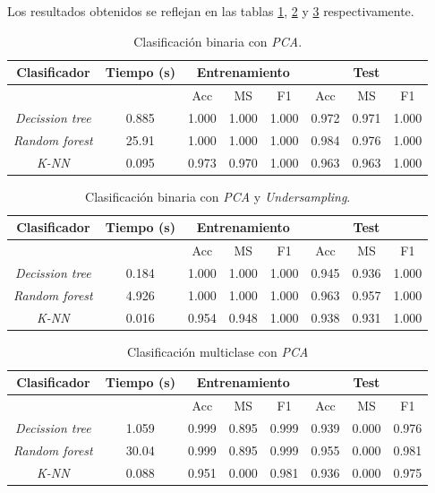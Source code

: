 Los resultados obtenidos se reflejan en las tablas \ref{tabla:binary_pca}, \ref{tabla:binary_under} y \ref{tabla:multi_pca} respectivamente.

\begin{table}[th]
	\centering
	\begin{tabular}{ |c|c|c|c|c|c|c|c| }
		\hline
		\rowcolor{LightCyan}
		Clasificador & Tiempo (s) & \multicolumn{3}{c|}{Entrenamiento} & \multicolumn{3}{c|}{Test} \\
		\hline
		\rowcolor{LightCyan}
		&            & Acc & MS & F1 & Acc & MS & F1 \\
		\hline
		\textit{Decission tree} & 0.885 & 1.000 & 1.000 & 1.000 & 0.972 & 0.971 & 1.000 \\
		\textit{Random forest}  & 25.91 & 1.000 & 1.000 & 1.000 & 0.984 & 0.976 & 1.000 \\
		\textit{K-NN}           & 0.095 & 0.973 & 0.970 & 1.000 & 0.963 & 0.963 & 1.000 \\
		\hline
	\end{tabular}
	\caption{Clasificación binaria con \textit{PCA}.}
	\label{tabla:binary_pca}
\end{table}

\begin{table}[th]
	\centering
	\begin{tabular}{ |c|c|c|c|c|c|c|c| }
		\hline
		\rowcolor{LightCyan}
		Clasificador & Tiempo (s) & \multicolumn{3}{c|}{Entrenamiento} & \multicolumn{3}{c|}{Test} \\
		\hline
		\rowcolor{LightCyan}
		&            & Acc & MS & F1 & Acc & MS & F1 \\
		\hline
		\textit{Decission tree} & 0.184 & 1.000 & 1.000 & 1.000 & 0.945 & 0.936 & 1.000 \\
		\textit{Random forest}  & 4.926 & 1.000 & 1.000 & 1.000 & 0.963 & 0.957 & 1.000 \\
		\textit{K-NN}           & 0.016 & 0.954 & 0.948 & 1.000 & 0.938 & 0.931 & 1.000 \\
		\hline
	\end{tabular}
	\caption{Clasificación binaria con \textit{PCA} y \textit{Undersampling}.}
	\label{tabla:binary_under}
\end{table}

\begin{table}[th]
	\centering
	\begin{tabular}{ |c|c|c|c|c|c|c|c| }
		\hline
		\rowcolor{LightCyan}
		Clasificador & Tiempo (s) & \multicolumn{3}{c|}{Entrenamiento} & \multicolumn{3}{c|}{Test} \\
		\hline
		\rowcolor{LightCyan}
		& & Acc & MS & F1 & Acc & MS & F1 \\
		\hline
		\textit{Decission tree} & 1.059 & 0.999 & 0.895 & 0.999 & 0.939 & 0.000 & 0.976 \\
		\textit{Random forest}  & 30.04 & 0.999 & 0.895 & 0.999 & 0.955 & 0.000 & 0.981 \\
		\textit{K-NN}           & 0.088 & 0.951 & 0.000 & 0.981 & 0.936 & 0.000 & 0.975 \\
		\hline
	\end{tabular}
	\caption{Clasificación multiclase con \textit{PCA}}
	\label{tabla:multi_pca}
\end{table}

